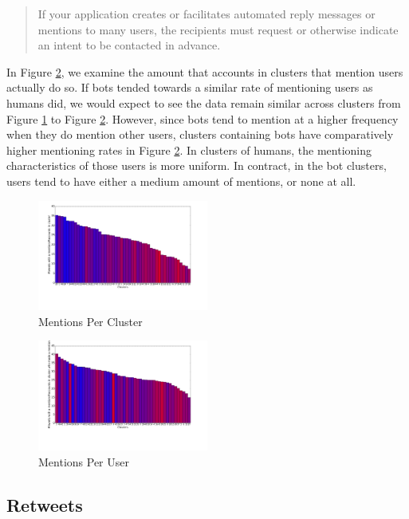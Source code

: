 \documentclass{sig-alternate-05-2015}
\begin{document}
\begin{quote}If your application creates or facilitates automated reply messages or mentions to many users, the recipients must request or otherwise indicate an intent to be contacted in advance.\cite{twitter:automation}\end{quote}

In Figure \ref{fig:ment2}, we examine the amount that accounts in clusters that mention users actually do so. If bots tended towards a similar rate of mentioning users as humans did, we would expect to see the data remain similar across clusters from Figure \ref{fig:ment1} to Figure \ref{fig:ment2}. However, since bots tend to mention at a higher frequency when they do mention other users, clusters containing bots have comparatively higher mentioning rates in Figure \ref{fig:ment2}. In clusters of humans, the mentioning characteristics of those users is more uniform. In contract, in the bot clusters, users tend to have either a medium amount of mentions, or none at all.

\begin{figure}[h!]
	\caption{Mentions Per Cluster}
	\label{fig:ment1}
	\centering
		\includegraphics[width=0.5\textwidth]{imgs/mentionspercluster}
\end{figure}

\begin{figure}[h!]
	\caption{Mentions Per User}
	\label{fig:ment2}
	\centering
		\includegraphics[width=0.5\textwidth]{imgs/mentionsperuserpercluster}
\end{figure}

\subsection{Retweets}
\end{document}
